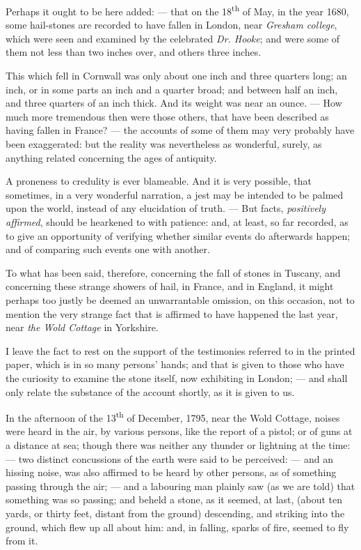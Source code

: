 \documentclass[a4paper, 12pt, oneside, twocolumn]{article}
\begin{document}
Perhaps it ought to be here added: --- that on the 18\textsuperscript{th} of May, in the year 1680, some hail-stones are recorded to have fallen in London, near \emph{Gresham college}, which were seen and examined by the celebrated \emph{Dr. Hooke}; and were some of them not less than two inches over, and others three inches.

This which fell in Cornwall was only about one inch and three quarters long; an inch, or in some parts an inch and a quarter broad; and between half an inch, and three quarters of an inch thick. And its weight was near an ounce. --- How much more tremendous then were those others, that have been described as having fallen in France? --- the accounts of some of them may very probably have been exaggerated: but the reality was nevertheless as wonderful, surely, as anything related concerning the ages of antiquity.

A proneness to credulity is ever blameable. And it is very possible, that sometimes, in a very wonderful narration, a jest may be intended to be palmed upon the world, instead of any elucidation of truth. --- But facts, \emph{positively affirmed}, should be hearkened to with patience: and, at least, so far recorded, as to give an opportunity of verifying whether similar events do afterwards happen; and of comparing such events one with another.

To what has been said, therefore, concerning the fall of stones in Tuscany, and concerning these strange showers of hail, in France, and in England, it might perhaps too justly be deemed an unwarrantable omission, on this occasion, not to mention the very strange fact that is affirmed to have happened the last year, near \emph{the Wold Cottage} in Yorkshire.

I leave the fact to rest on the support of the testimonies referred to in the printed paper, which is in so many persons' hands; and that is given to those who have the curiosity to examine the stone itself, now exhibiting in London; --- and shall only relate the substance of the account shortly, as it is given to us.

In the afternoon of the 13\textsuperscript{th} of December, 1795, near the Wold Cottage, noises were heard in the air, by various persons, like the report of a pistol; or of guns at a distance at sea; though there was neither any thunder or lightning at the time: --- two distinct concussions of the earth were said to be perceived: --- and an hissing noise, was also affirmed to be heard by other persons, as of something passing through the air; --- and a labouring man plainly saw (as we are told) that something was so passing; and beheld a stone, as it seemed, at last, (about ten yards, or thirty feet, distant from the ground) descending, and striking into the ground, which flew up all about him: and, in falling, sparks of fire, seemed to fly from it.
\end{document}
